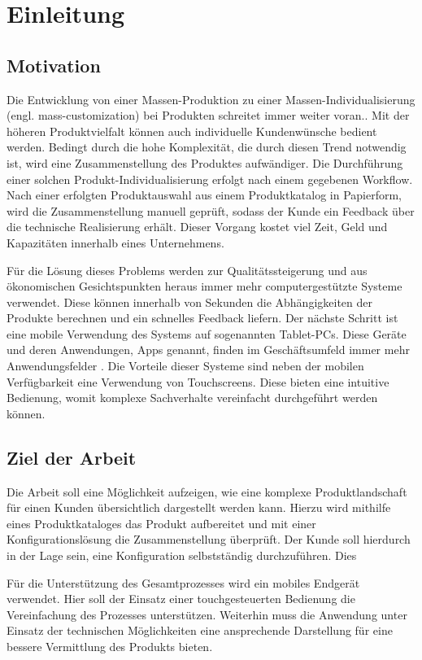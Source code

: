 \chapter{Einleitung}
\section{Motivation} \label{aufgaben}
Die Entwicklung von einer Massen-Produktion zu einer Massen-Individualisierung (engl. mass-customization) bei Produkten schreitet immer weiter voran.\cite{bib:massCustomization}. Mit der höheren Produktvielfalt können auch individuelle Kundenwünsche bedient werden. Bedingt durch die hohe Komplexität, die durch diesen Trend notwendig ist, wird eine Zusammenstellung des Produktes aufwändiger. Die Durchführung einer solchen Produkt-Individualisierung erfolgt nach einem gegebenen Workflow. Nach einer erfolgten Produktauswahl aus einem Produktkatalog in Papierform, wird die Zusammenstellung manuell geprüft, sodass der Kunde ein Feedback über die technische Realisierung erhält. Dieser Vorgang kostet viel Zeit, Geld und Kapazitäten innerhalb eines Unternehmens. \par

Für die Lösung dieses Problems werden zur Qualitätssteigerung und aus ökonomischen Gesichtspunkten heraus immer mehr computergestützte Systeme verwendet. Diese können innerhalb von Sekunden die Abhängigkeiten der Produkte berechnen und ein schnelles Feedback liefern. Der nächste Schritt ist eine mobile Verwendung des Systems auf sogenannten Tablet-PCs. Diese Geräte und deren Anwendungen, Apps genannt, finden im Geschäftsumfeld immer mehr Anwendungsfelder \cite{bib:businessApps}. Die Vorteile dieser Systeme sind neben der mobilen Verfügbarkeit eine Verwendung von Touchscreens. Diese bieten eine intuitive Bedienung, womit komplexe Sachverhalte vereinfacht durchgeführt werden können.
 
\section{Ziel der Arbeit} \label{goal}
Die Arbeit soll eine Möglichkeit aufzeigen, wie eine komplexe Produktlandschaft für einen Kunden übersichtlich dargestellt werden kann. Hierzu wird mithilfe eines Produktkataloges das Produkt aufbereitet und mit einer Konfigurationslösung die Zusammenstellung überprüft. Der Kunde soll hierdurch in der Lage sein, eine Konfiguration selbstständig durchzuführen. Dies

Für die Unterstützung des Gesamtprozesses wird ein mobiles Endgerät verwendet. Hier soll der Einsatz einer touchgesteuerten Bedienung die Vereinfachung des Prozesses unterstützen. Weiterhin muss die Anwendung unter Einsatz der technischen Möglichkeiten eine ansprechende Darstellung für eine bessere Vermittlung des Produkts bieten. 

